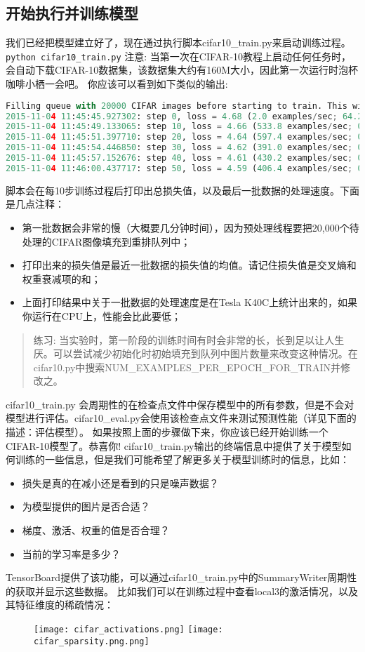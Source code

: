 {\subsection{开始执行并训练模型}
我们已经把模型建立好了，现在通过执行脚本cifar10\_train.py来启动训练过程。
\lstinline[language=Bash]{python cifar10_train.py}
注意: 当第一次在CIFAR-10教程上启动任何任务时，会自动下载CIFAR-10数据集，该数据集大约有160M大小，因此第一次运行时泡杯咖啡小栖一会吧。
你应该可以看到如下类似的输出:
\begin{lstlisting}[language=Python]
Filling queue with 20000 CIFAR images before starting to train. This will take a few minutes.
2015-11-04 11:45:45.927302: step 0, loss = 4.68 (2.0 examples/sec; 64.221 sec/batch)
2015-11-04 11:45:49.133065: step 10, loss = 4.66 (533.8 examples/sec; 0.240 sec/batch)
2015-11-04 11:45:51.397710: step 20, loss = 4.64 (597.4 examples/sec; 0.214 sec/batch)
2015-11-04 11:45:54.446850: step 30, loss = 4.62 (391.0 examples/sec; 0.327 sec/batch)
2015-11-04 11:45:57.152676: step 40, loss = 4.61 (430.2 examples/sec; 0.298 sec/batch)
2015-11-04 11:46:00.437717: step 50, loss = 4.59 (406.4 examples/sec; 0.315 sec/batch)
\end{lstlisting}
脚本会在每10步训练过程后打印出总损失值，以及最后一批数据的处理速度。下面是几点注释：
\begin{itemize}
\item 第一批数据会非常的慢（大概要几分钟时间），因为预处理线程要把20,000个待处理的CIFAR图像填充到重排队列中；
\item 打印出来的损失值是最近一批数据的损失值的均值。请记住损失值是交叉熵和权重衰减项的和；
\item 上面打印结果中关于一批数据的处理速度是在Tesla K40C上统计出来的，如果你运行在CPU上，性能会比此要低；
\end{itemize}
\begin{quote}
练习: 当实验时，第一阶段的训练时间有时会非常的长，长到足以让人生厌。可以尝试减少初始化时初始填充到队列中图片数量来改变这种情况。在cifar10.py中搜索NUM\_EXAMPLES\_PER\_EPOCH\_FOR\_TRAIN并修改之。
\end{quote}
cifar10\_train.py 会周期性的在检查点文件中保存模型中的所有参数，但是不会对模型进行评估。cifar10\_eval.py会使用该检查点文件来测试预测性能（详见下面的描述：评估模型）。
如果按照上面的步骤做下来，你应该已经开始训练一个CIFAR-10模型了。恭喜你!
cifar10\_train.py输出的终端信息中提供了关于模型如何训练的一些信息，但是我们可能希望了解更多关于模型训练时的信息，比如：
\begin{itemize}
\item 损失是真的在减小还是看到的只是噪声数据？
\item 为模型提供的图片是否合适？
\item 梯度、激活、权重的值是否合理？
\item 当前的学习率是多少？
\end{itemize}
TensorBoard提供了该功能，可以通过cifar10\_train.py中的SummaryWriter周期性的获取并显示这些数据。
比如我们可以在训练过程中查看local3的激活情况，以及其特征维度的稀疏情况：
\begin{figure}[H]
\centering
\texttt{[image: cifar\_activations.png]}
\texttt{[image: cifar\_sparsity.png.png]}
\end{figure}
}
